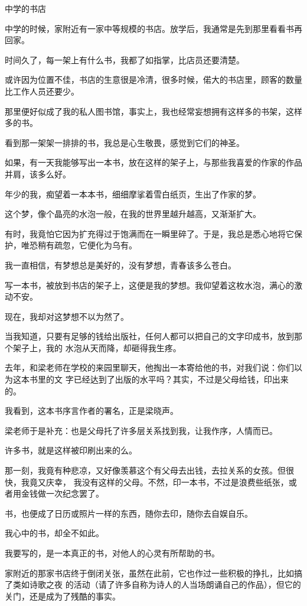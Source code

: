 \documentclass[12pt,a4paper]{article}
\newcommand{\subpart}[1]{
	\begingroup \par
	\vspace{1ex} \centering #1
	\par \endgroup \nopagebreak[4]
}
\begin{document}
		\subpart{中学的书店}

		中学的时候，家附近有一家中等规模的书店。放学后，我通常是先到那里看看书再回家。\par
		时间久了，每一架上有什么书，我都了如指掌，比店员还要清楚。\par
		或许因为位置不佳，书店的生意很是冷清，很多时候，偌大的书店里，顾客的数量比工作人员还要少。\par
		那里便好似成了我的私人图书馆，事实上，我也经常妄想拥有这样多的书架，这样多的书。\par
		看到那一架架一排排的书，我总是心生敬畏，感觉到它们的神圣。

		如果，有一天我能够写出一本书，放在这样的架子上，与那些我喜爱的作家的作品并肩，该多么好。

		年少的我，痴望着一本本书，细细摩挲着雪白纸页，生出了作家的梦。\par
		这个梦，像个晶亮的水泡一般，在我的世界里越升越高，又渐渐扩大。\par
		有时，我竟怕它因为扩充得过于饱满而在一瞬里碎了。于是，我总是悉心地将它保护，唯恐稍有疏忽，它便化为乌有。\par
		我一直相信，有梦想总是美好的，没有梦想，青春该多么苍白。

		写一本书，被放到书店的架子上，这便是我的梦想。我仰望着这枚水泡，满心的激动不安。\par
		现在，我却对这梦想不以为然了。

		当我知道，只要有足够的钱给出版社，任何人都可以把自己的文字印成书，放到那个架子上，我的
	水泡从天而降，却砸得我生疼。

		去年，和梁老师在学校的来园里聊天，他掏出一本寄给他的书，对我们说：你们以为这本书里的文
	字已经达到了出版的水平吗？其实，不过是父母给钱，印出来的。

		我看到，这本书序言作者的署名，正是梁晓声。\par
		梁老师于是补充：也是父母托了许多层关系找到我，让我作序，人情而已。

		许多书，就是这样被印刷出来的么。

		那一刻，我竟有种悲凉，又好像羡慕这个有父母去出钱，去拉关系的女孩。但很快，我竟又庆幸，
	我没有这样的父母。不然，印一本书，不过是浪费些纸张，或者用金钱做一次纪念罢了。

		书，也便成了日历或照片一样的东西，随你去印，随你去自娱自乐。\par
		我心中的书，却全不如此。\par
		我要写的，是一本真正的书，对他人的心灵有所帮助的书。

		家附近的那家书店终于倒闭关张，虽然在此前，它也作过一些积极的挣扎，比如搞了类如诗歌之夜
	的活动（请了许多自称为诗人的人当场朗诵自己的作品），但它的关门，还是成为了残酷的事实。
\end{document}
